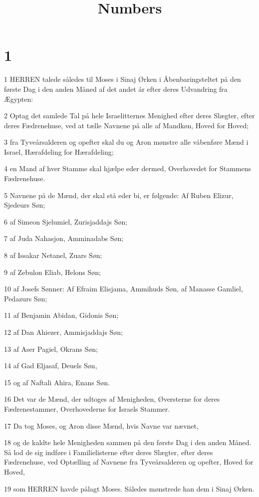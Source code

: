 

\title{Numbers}


\chapter{1}

\par 1 HERREN talede således til Moses i Sinaj Ørken i Åbenbaringsteltet på den første Dag i den anden Måned af det andet år efter deres Udvandring fra Ægypten:
\par 2 Optag det samlede Tal på hele Israelitternes Menighed efter deres Slægter, efter deres Fædrenehuse, ved at tælle Navnene på alle af Mandkøn, Hoved for Hoved;
\par 3 fra Tyveårsalderen og opefter skal du og Aron mønstre alle våbenføre Mænd i Israel, Hærafdeling for Hærafdeling;
\par 4 en Mand af hver Stamme skal hjælpe eder dermed, Overhovedet for Stammens Fædrenehuse.
\par 5 Navnene på de Mænd, der skal stå eder bi, er følgende: Af Ruben Elizur, Sjedeurs Søn;
\par 6 af Simeon Sjelumiel, Zurisjaddajs Søn;
\par 7 af Juda Nahasjon, Amminadabs Søn;
\par 8 af Issakar Netanel, Zuars Søn;
\par 9 af Zebulon Eliab, Helons Søn;
\par 10 af Josefs Sønner: Af Efraim Elisjama, Ammihuds Søn, af Manasse Gamliel, Pedazurs Søn;
\par 11 af Benjamin Abidan, Gidonis Søn;
\par 12 af Dan Ahiezer, Ammisjaddajs Søn;
\par 13 af Aser Pagiel, Okrans Søn;
\par 14 af Gad Eljasaf, Deuels Søn,
\par 15 og af Naftali Ahira, Enans Søn.
\par 16 Det var de Mænd, der udtoges af Menigheden, Øversterne for deres Fædrenestammer, Overhovederne for Israels Stammer.
\par 17 Da tog Moses, og Aron disse Mænd, hvis Navne var nævnet,
\par 18 og de kaldte hele Menigheden sammen på den første Dag i den anden Måned. Så lod de sig indføre i Familielisterne efter deres Slægter, efter deres Fædrenehuse, ved Optælling af Navnene fra Tyveårsalderen og opefter, Hoved for Hoved,
\par 19 som HERREN havde pålagt Moses. Således mønstrede han dem i Sinaj Ørken.
